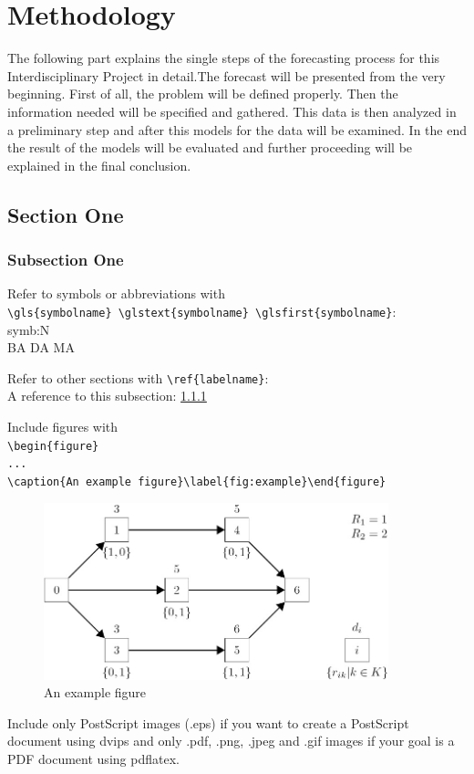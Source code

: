 \chapter{Methodology}\label{chapter:Methodology}

The following part explains the single steps of the forecasting process for this Interdisciplinary Project in detail.The forecast will be presented from the very beginning.\newline
First of all, the problem will be defined properly. Then the information needed will be specified and gathered. This data is then analyzed in a preliminary step and after this models for the data will be examined. In the end the result of the models will be evaluated and further proceeding will be explained in the final conclusion.
\section{Section One}\label{section:Section One}
\subsection{Subsection One}\label{labelname}

Refer to symbols or abbreviations with\\\verb+\gls{symbolname} \glstext{symbolname} \glsfirst{symbolname}+:\\
\gls{symb:N}  \\
\gls{BA} \gls{DA} \gls{MA}

Refer to other sections with \verb+\ref{labelname}+:\\
A reference to this subsection: \ref{labelname}

Include figures with\\
\verb+\begin{figure}+\\
\verb+...+\\
\verb+\caption{An example figure}\label{fig:example}\end{figure}+

\begin{figure}[h]
\begin{center}
\includegraphics[width=10cm]{images/example_figure}
\caption{An example figure}
\label{fig:example}
\end{center}
\end{figure}

Include only PostScript images (.eps) if you want to create a PostScript document using dvips and only .pdf, .png, .jpeg and .gif images if your goal is a PDF document using pdflatex.
